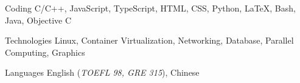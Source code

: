 

\begin{cvskills}

  \cvskill
    {Coding} %
    {C/C++, JavaScript, TypeScript, HTML, CSS, Python, LaTeX, Bash, Java, Objective C} %

  \cvskill
    {Technologies} %
    {Linux, Container Virtualization, Networking, Database, Parallel Computing, Graphics} %

  \cvskill
    {Languages} %
    {English (\textit{TOEFL 98, GRE 315}), Chinese} %

\end{cvskills}
